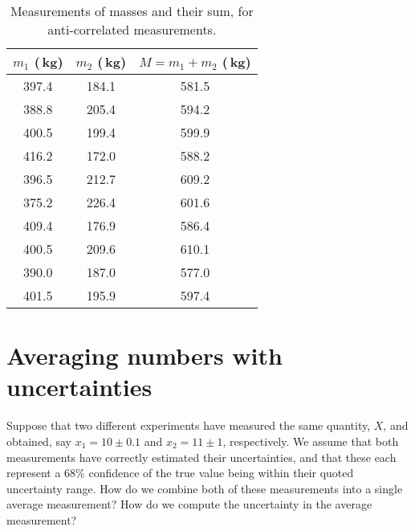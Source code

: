 \begin{table}[h!]
\center
\begin{tabular}{ |c|c|c| }
  \hline
  \textbf{$m_1$ (\,kg)} & \textbf{$m_2$ (\,kg)} & \textbf{$M=m_1+m_2$ (\,kg)}\\
  \hline
397.4 & 184.1 & 581.5\\ 
 \hline
388.8 & 205.4 & 594.2\\ 
 \hline
400.5 & 199.4 & 599.9\\ 
 \hline
416.2 & 172.0 & 588.2\\ 
 \hline
396.5 & 212.7 & 609.2\\ 
 \hline
375.2 & 226.4 & 601.6\\ 
 \hline
409.4 & 176.9 & 586.4\\ 
 \hline
400.5 & 209.6 & 610.1\\ 
 \hline
390.0 & 187.0 & 577.0\\ 
 \hline
401.5 & 195.9 & 597.4\\ 
 \hline
\end{tabular}
\caption{\label{tab:massSum2}Measurements of masses and their sum, for anti-correlated measurements.}
\end{table}


\section{Averaging numbers with uncertainties}
Suppose that two different experiments have measured the same quantity, $X$, and obtained, say $x_1=10 \pm 0.1$ and $x_2=11 \pm 1$, respectively. We assume that both measurements have correctly estimated their uncertainties, and that these each represent a 68\% confidence of the true value being within their quoted uncertainty range. How do we combine both of these measurements into a single average measurement? How do we compute the uncertainty in the average measurement?

